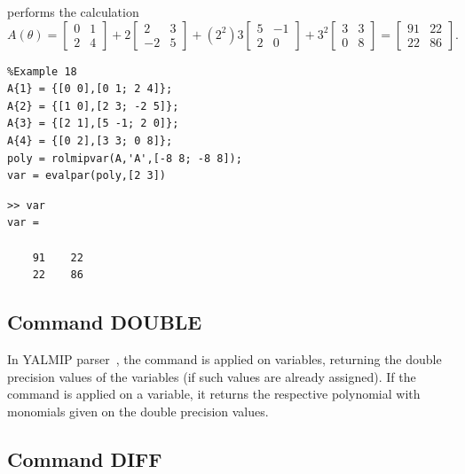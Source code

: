 \documentclass[english,11pt]{article}
\theoremstyle{break} \theorembodyfont{\small\rm}
\begin{document}
\noindent performs the calculation
\[
 A(\theta) = \begin{bmatrix} 0 & 1 \\ 2 & 4 \end{bmatrix} +
 2 \begin{bmatrix} 2 & 3 \\ -2 & 5 \end{bmatrix} +
 (2^2)3 \begin{bmatrix} 5 & -1\\ 2 & 0 \end{bmatrix} +
 3^2 \begin{bmatrix} 3 & 3 \\ 0 & 8 \end{bmatrix} = 
 \begin{bmatrix} 91 & 22 \\ 22 & 86 \end{bmatrix}.
\]

\begin{minipage}{9.5cm}
 \begin{lstlisting}
%Example 18
A{1} = {[0 0],[0 1; 2 4]};
A{2} = {[1 0],[2 3; -2 5]};
A{3} = {[2 1],[5 -1; 2 0]};
A{4} = {[0 2],[3 3; 0 8]};
poly = rolmipvar(A,'A',[-8 8; -8 8]);
var = evalpar(poly,[2 3])
 \end{lstlisting}
\end{minipage}
\vspace{0.2cm}

\begin{minipage}{7.5cm}
\begin{lstlisting}[rulecolor=\color{red}]
>> var
var =

    91    22
    22    86
\end{lstlisting}
\end{minipage}
\vspace{0.2cm}

\subsection*{Command DOUBLE}

In YALMIP parser~\cite{Lof:04}, the command  is applied on  variables,
returning the double precision values of the variables (if such values are already assigned).
If the command  is applied on a  variable, it returns the
respective polynomial with monomials given on the double precision values.

\subsection*{Command DIFF}
\end{document}
